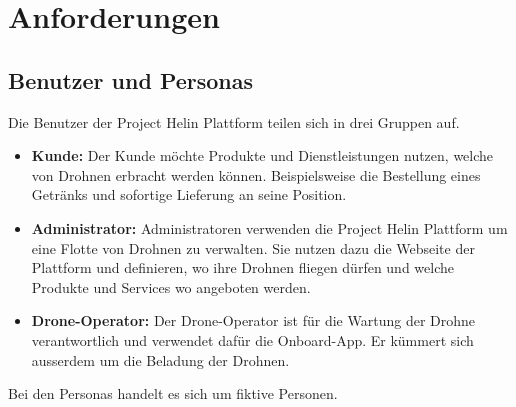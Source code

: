 \chapter{Anforderungen}
\section{Benutzer und Personas}
Die Benutzer der Project Helin Plattform teilen sich in drei Gruppen auf.
\begin{itemize}
	\item{\textbf{Kunde:} Der Kunde möchte Produkte und Dienstleistungen nutzen, welche von Drohnen erbracht werden können. Beispielsweise die Bestellung eines Getränks und sofortige Lieferung an seine Position.}
	\item{\textbf{Administrator:} Administratoren verwenden die Project Helin Plattform um eine Flotte von Drohnen zu verwalten. Sie nutzen dazu die Webseite der Plattform und definieren, wo ihre Drohnen fliegen dürfen und welche Produkte und Services wo angeboten werden.}
	\item{\textbf{Drone-Operator:} Der Drone-Operator ist für die Wartung der Drohne verantwortlich und verwendet dafür die Onboard-App. Er kümmert sich ausserdem um die Beladung der Drohnen.}
\end{itemize}

Bei den Personas handelt es sich um fiktive Personen.
